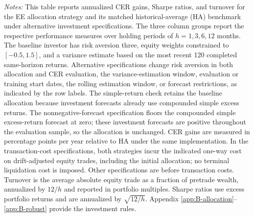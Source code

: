 \begin{table}[H]
\begin{minipage}[t]{\linewidth}
\textit{Notes:} This table reports annualized CER gains, Sharpe ratios, and turnover for the EE allocation strategy and its matched historical-average (HA) benchmark under alternative investment specifications. The three column groups report the respective performance measures over holding periods of $h=1,3,6,12$ months. The baseline investor has risk aversion three, equity weights constrained to $[-0.5,1.5]$, and a variance estimate based on the most recent 120 completed same-horizon returns. Alternative specifications change risk aversion in both allocation and CER evaluation, the variance-estimation window, evaluation or training start dates, the rolling estimation window, or forecast restrictions, as indicated by the row labels. The simple-return check retains the baseline allocation because investment forecasts already use compounded simple excess returns. The nonnegative-forecast specification floors the compounded simple excess-return forecast at zero; these investment forecasts are positive throughout the evaluation sample, so the allocation is unchanged. CER gains are measured in percentage points per year relative to HA under the same implementation. In the transaction-cost specifications, both strategies incur the indicated one-way cost on drift-adjusted equity trades, including the initial allocation; no terminal liquidation cost is imposed. Other specifications are before transaction costs. Turnover is the average absolute equity trade as a fraction of pretrade wealth, annualized by $12/h$ and reported in portfolio multiples. Sharpe ratios use excess portfolio returns and are annualized by $\sqrt{12/h}$. Appendix \ref{app:B-allocation}--\ref{app:B-robust} provide the investment rules.\par\end{minipage}
\end{table}
